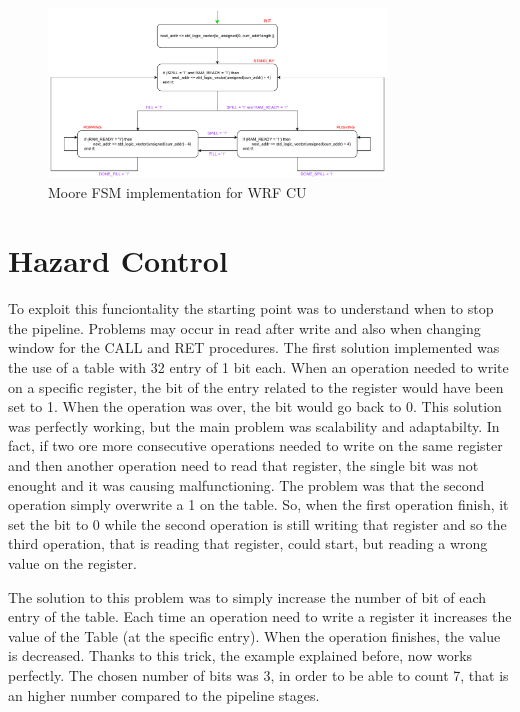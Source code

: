 \begin{figure}[ht]
	\centering
	\includegraphics[width=0.8\textwidth]{chapters/4_DecodeStage/images/wRF_CU.pdf}
	\caption{Moore FSM implementation for WRF CU}
	\label{wrf_cu}
\end{figure}

\section{Hazard Control}
To exploit this funciontality the starting point was to understand when to stop the pipeline. Problems may occur in read after write and also when changing window for the CALL and RET procedures. 
The first solution implemented was the use of a table with 32 entry of 1 bit each. When an operation needed to write on a specific register, the bit of the entry related to the register would have been set to 1. When the operation was over, the bit would go back to 0. This solution was perfectly working, but the main problem was scalability and adaptabilty. In fact, if two ore more consecutive operations needed to write on the same register and then another operation need to read that register, the single bit was not enought and it was causing malfunctioning. The problem was that the second operation simply overwrite a 1 on the table. So, when the first operation finish, it set the bit to 0 while the second operation is still writing that register and so the third operation, that is reading that register, could start, but reading a wrong value on the register. 

The solution to this problem was to simply increase the number of bit of each entry of the table. Each time an operation need to write a register it increases the value of the Table (at the specific entry). When the operation finishes, the value is decreased. Thanks to this trick, the example explained before, now works perfectly. 
The chosen number of bits was 3, in order to be able to count 7, that is an higher number compared to the pipeline stages. 

